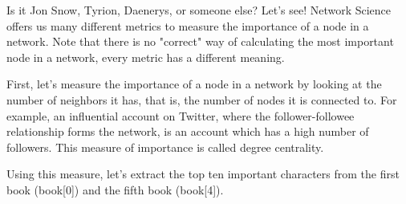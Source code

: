 \documentclass[11pt]{article}
\begin{document}
Is it Jon Snow, Tyrion, Daenerys, or someone else? Let's see! Network
Science offers us many different metrics to measure the importance of a
node in a network. Note that there is no "correct" way of calculating
the most important node in a network, every metric has a different
meaning.

First, let's measure the importance of a node in a network by looking at
the number of neighbors it has, that is, the number of nodes it is
connected to. For example, an influential account on Twitter, where the
follower-followee relationship forms the network, is an account which
has a high number of followers. This measure of importance is called
degree centrality.

Using this measure, let's extract the top ten important characters from
the first book (book{[}0{]}) and the fifth book (book{[}4{]}).
\end{document}
